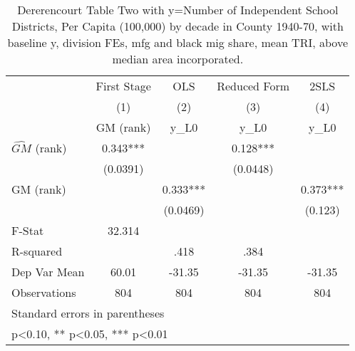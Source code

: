 \begin{table}[htbp]\centering
\def\sym#1{\ifmmode^{#1}\else\(^{#1}\)\fi}
\caption{Dererencourt Table Two with y=Number of Independent School Districts, Per Capita (100,000) by decade in County 1940-70, with baseline y, division FEs, mfg and black mig share, mean TRI, above median area incorporated.}
\begin{tabular}{l*{4}{c}}
\toprule
                    & First Stage   &         OLS   &Reduced Form   &        2SLS   \\
                    &\multicolumn{1}{c}{(1)}&\multicolumn{1}{c}{(2)}&\multicolumn{1}{c}{(3)}&\multicolumn{1}{c}{(4)}\\
                    &\multicolumn{1}{c}{GM  (rank)}&\multicolumn{1}{c}{y\_L0}&\multicolumn{1}{c}{y\_L0}&\multicolumn{1}{c}{y\_L0}\\
\midrule
$\hat{GM}$ (rank)   &       0.343***&               &       0.128***&               \\
                    &    (0.0391)   &               &    (0.0448)   &               \\
\addlinespace
GM  (rank)          &               &       0.333***&               &       0.373***\\
                    &               &    (0.0469)   &               &     (0.123)   \\
\midrule
F-Stat              &      32.314   &               &               &               \\
R-squared           &               &        .418   &        .384   &               \\
Dep Var Mean        &       60.01   &      -31.35   &      -31.35   &      -31.35   \\
Observations        &         804   &         804   &         804   &         804   \\
\bottomrule
\multicolumn{5}{l}{\footnotesize Standard errors in parentheses}\\
\multicolumn{5}{l}{\footnotesize * p<0.10, ** p<0.05, *** p<0.01}\\
\end{tabular}
\end{table}

